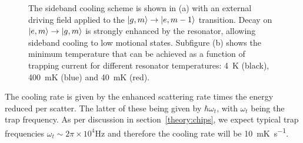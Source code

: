 \begin{figure}[htb]
  \centering
  \begin{subfigure}[c]{0.4\textwidth}
  \end{subfigure}
  \hspace{1cm}
  \begin{subfigure}[c]{0.48\textwidth}
  \end{subfigure}
  \caption{The sideband cooling scheme is shown in (a) with an external driving field applied to the
    $\ket{g, m}\rightarrow\ket{e, m-1}$ transition. Decay on
    $\ket{e,m}\rightarrow\ket{g,m}$ is strongly enhanced by the resonator,
    allowing sideband cooling to low motional states. Subfigure (b) shows the
    minimum temperature that can be achieved as a function of trapping current
    for different resonator temperatures: \SI{4}{\kelvin} (black),
    \SI{400}{\milli\kelvin} (blue) and \SI{40}{\milli\kelvin} (red).
    }
  \label{mws:fig:sideband}
\end{figure}
%
The cooling rate is given by the enhanced scattering rate times the energy
reduced per scatter. The latter of these being given by $\hbar\omega_t$, with
$\omega_t$ being the trap frequency. As per discussion in
section~\ref{theory:chips}, we expect typical trap frequencies $\omega_t\sim
2\pi \times 10^4 \si{\hertz}$ and therefore the cooling rate will be
\SI{10}{\milli\kelvin\per\second}.

